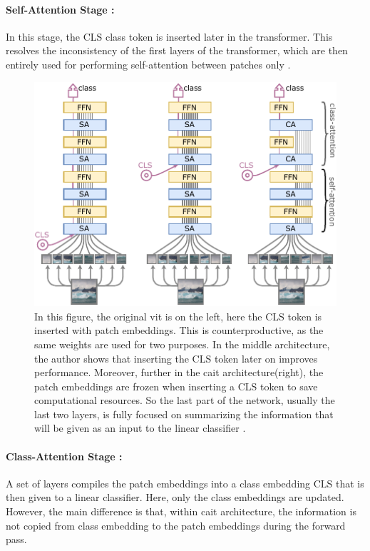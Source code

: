 \paragraph{Self-Attention Stage :} In this stage, the CLS class token is inserted later in the transformer. This resolves the inconsistency of the first layers of the transformer, which are then entirely used for performing self-attention between patches only \cite{touvron2021going}. 

\begin{figure}
    \centering
    \includegraphics[width=0.75\linewidth]{Rohit_Master_Thesis//Images/cait_architecture.pdf}
    \caption{In this figure, the original \gls{vit} is on the left, here the CLS token is inserted with patch embeddings. This is counterproductive, as the same weights are used for two purposes. In the middle architecture, the author shows that inserting the CLS token later on improves performance. Moreover, further in the \gls{cait} architecture(right), the patch embeddings are frozen when inserting a CLS token to save computational resources. So the last part of the network, usually the last two layers, is fully focused on summarizing the information that will be given as an input to the linear classifier \cite{touvron2021going}.}
    \label{fig:cait architecture}
\end{figure}

\paragraph{Class-Attention Stage :} A set of layers compiles the patch embeddings into a class embedding CLS that is then given to a linear classifier. Here, only the class embeddings are updated. However, the main difference is that, within \gls{cait} architecture, the information is not copied from class embedding to the patch embeddings during the forward pass.

